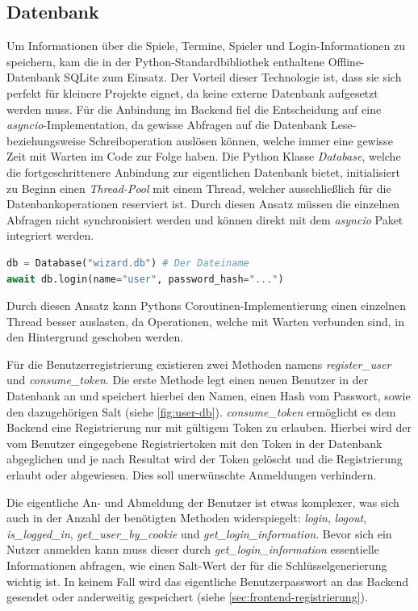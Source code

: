 \subsection{Datenbank}
Um Informationen über die Spiele, Termine, Spieler und Login-Informationen zu speichern, kam die in der Python-Standardbibliothek enthaltene Offline-Datenbank SQLite zum Einsatz. Der Vorteil dieser Technologie ist, dass sie sich perfekt für kleinere Projekte eignet, da keine externe Datenbank aufgesetzt werden muss. Für die Anbindung im Backend fiel die Entscheidung auf eine \textit{asyncio}-Implementation, da gewisse Abfragen auf die Datenbank Lese- beziehungsweise Schreiboperation auslösen können, welche immer eine gewisse Zeit mit Warten im Code zur Folge haben. Die Python Klasse \textit{Database}, welche die fortgeschrittenere Anbindung zur eigentlichen Datenbank bietet, initialisiert zu Beginn einen \textit{Thread-Pool} mit einem Thread, welcher ausschließlich für die Datenbankoperationen reserviert ist. Durch diesen Ansatz müssen die einzelnen Abfragen nicht synchronisiert werden und können direkt mit dem \textit{asyncio} Paket integriert werden.

\begin{lstlisting}[language=Python]
db = Database("wizard.db") # Der Dateiname
await db.login(name="user", password_hash="...")
\end{lstlisting}

Durch diesen Ansatz kann Pythons Coroutinen-Implementierung einen einzelnen Thread besser auslasten, da Operationen, welche mit Warten verbunden sind, in den Hintergrund geschoben werden.

Für die Benutzerregistrierung existieren zwei Methoden namens \textit{register\_user} und \textit{consume\_token}. Die erste Methode legt einen neuen Benutzer in der Datenbank an und speichert hierbei den Namen, einen Hash vom Passwort, sowie den dazugehörigen Salt (siehe \cref{fig:user-db}). \textit{consume\_token} ermöglicht es dem Backend eine Registrierung nur mit gültigem Token zu erlauben. Hierbei wird der vom Benutzer eingegebene Registriertoken mit den Token in der Datenbank abgeglichen und je nach Resultat wird der Token gelöscht und die Registrierung erlaubt oder abgewiesen. Dies soll unerwünschte Anmeldungen verhindern.

Die eigentliche An- und Abmeldung der Benutzer ist etwas komplexer, was sich auch in der Anzahl der benötigten Methoden widerspiegelt: \textit{login}, \textit{logout}, \textit{is\_logged\_in}, \textit{get\_user\_by\_cookie} und \textit{get\_login\_information}. Bevor sich ein Nutzer anmelden kann muss dieser durch \textit{get\_login\_information} essentielle Informationen abfragen, wie einen Salt-Wert der für die Schlüsselgenerierung wichtig ist. In keinem Fall wird das eigentliche Benutzerpasswort an das Backend gesendet oder anderweitig gespeichert (siehe \cref{sec:frontend-registrierung}).

